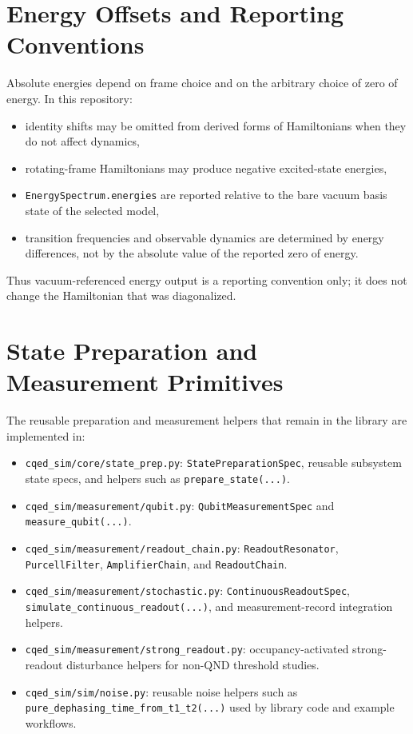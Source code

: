 \documentclass[11pt]{article}
\begin{document}
\section{Energy Offsets and Reporting Conventions}
Absolute energies depend on frame choice and on the arbitrary choice of zero of
energy. In this repository:
\begin{itemize}[leftmargin=1.5em]
  \item identity shifts may be omitted from derived forms of Hamiltonians when
  they do not affect dynamics,
  \item rotating-frame Hamiltonians may produce negative excited-state energies,
  \item \texttt{EnergySpectrum.energies} are reported relative to the bare vacuum
  basis state of the selected model,
  \item transition frequencies and observable dynamics are determined by energy
  differences, not by the absolute value of the reported zero of energy.
\end{itemize}

\noindent
Thus vacuum-referenced energy output is a reporting convention only; it does not
change the Hamiltonian that was diagonalized.

\section{State Preparation and Measurement Primitives}
The reusable preparation and measurement helpers that remain in the library are
implemented in:
\begin{itemize}[leftmargin=1.5em]
  \item \texttt{cqed\_sim/core/state\_prep.py}:
  \texttt{StatePreparationSpec}, reusable subsystem state specs, and helpers such as
  \texttt{prepare\_state(...)}.
  \item \texttt{cqed\_sim/measurement/qubit.py}:
  \texttt{QubitMeasurementSpec} and \texttt{measure\_qubit(...)}.
  \item \texttt{cqed\_sim/measurement/readout\_chain.py}:
  \texttt{ReadoutResonator}, \texttt{PurcellFilter}, \texttt{AmplifierChain}, and
  \texttt{ReadoutChain}.
  \item \texttt{cqed\_sim/measurement/stochastic.py}:
  \texttt{ContinuousReadoutSpec}, \texttt{simulate\_continuous\_readout(...)},
  and measurement-record integration helpers.
  \item \texttt{cqed\_sim/measurement/strong\_readout.py}:
  occupancy-activated strong-readout disturbance helpers for non-QND threshold studies.
  \item \texttt{cqed\_sim/sim/noise.py}: reusable noise helpers such as
  \texttt{pure\_dephasing\_time\_from\_t1\_t2(...)} used by library code and example workflows.
\end{itemize}
\end{document}
